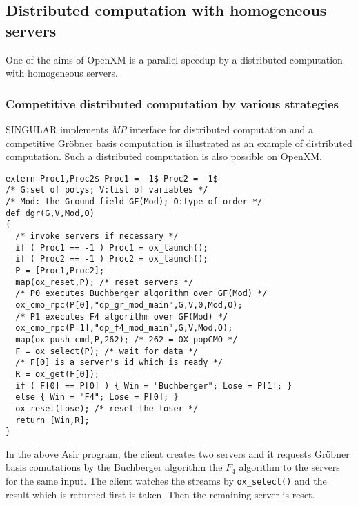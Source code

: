 
\subsection{Distributed computation with homogeneous servers}
\label{section:homog}

One of the aims of OpenXM is a parallel speedup by a distributed computation
with homogeneous servers. 

\subsubsection{Competitive distributed computation by various strategies}

SINGULAR \cite{Singular} implements {\it MP} interface for distributed
computation and a competitive Gr\"obner basis computation is
illustrated as an example of distributed computation.
Such a distributed computation is also possible on OpenXM.

\begin{verbatim}
extern Proc1,Proc2$ Proc1 = -1$ Proc2 = -1$
/* G:set of polys; V:list of variables */
/* Mod: the Ground field GF(Mod); O:type of order */
def dgr(G,V,Mod,O)
{
  /* invoke servers if necessary */
  if ( Proc1 == -1 ) Proc1 = ox_launch();
  if ( Proc2 == -1 ) Proc2 = ox_launch();
  P = [Proc1,Proc2];
  map(ox_reset,P); /* reset servers */
  /* P0 executes Buchberger algorithm over GF(Mod) */
  ox_cmo_rpc(P[0],"dp_gr_mod_main",G,V,0,Mod,O);
  /* P1 executes F4 algorithm over GF(Mod) */
  ox_cmo_rpc(P[1],"dp_f4_mod_main",G,V,Mod,O);
  map(ox_push_cmd,P,262); /* 262 = OX_popCMO */
  F = ox_select(P); /* wait for data */
  /* F[0] is a server's id which is ready */
  R = ox_get(F[0]);
  if ( F[0] == P[0] ) { Win = "Buchberger"; Lose = P[1]; }
  else { Win = "F4"; Lose = P[0]; }
  ox_reset(Lose); /* reset the loser */
  return [Win,R];
}
\end{verbatim}
In the above Asir program, the client creates two servers and it requests 
Gr\"obner basis comutations by the Buchberger algorithm the $F_4$ algorithm
to the servers for the same input.
The client watches the streams by {\tt ox\_select()}
and the result which is returned first is taken. Then the remaining
server is reset.

